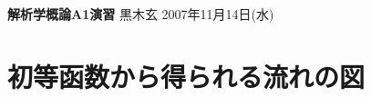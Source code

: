 \documentclass[12pt,twoside]{jarticle}
\newcommand\commentout[1]{#1}
\newcommand\commentout[1]{}
\begin{document}
\noindent
{\Large\bf 解析学概論A1演習}
\hfill
{\large 黒木玄}
\qquad
2007年11月14日(水)
\tableofcontents
\newpage

\section{初等函数から得られる流れの図}
\end{document}

